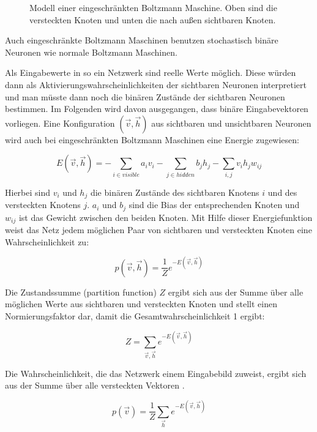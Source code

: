 \documentclass[12pt]{article}
\begin{document}
\begin{figure}[H]
	\center
	
	\caption{Modell einer eingeschränkten Boltzmann Maschine. Oben sind die versteckten Knoten und unten die nach außen sichtbaren Knoten.}
	\label{RBM}
	\end{figure}
\newpage	
Auch eingeschränkte Boltzmann Maschinen benutzen stochastisch binäre Neuronen wie normale Boltzmann Maschinen.


Als Eingabewerte in so ein Netzwerk sind reelle Werte möglich. Diese würden dann als Aktivierungswahrscheinlichkeiten der sichtbaren Neuronen interpretiert und man müsste dann noch die binären Zustände der sichtbaren Neuronen bestimmen. Im Folgenden wird davon ausgegangen, dass binäre Eingabevektoren vorliegen. 
Eine Konfiguration $(\vec{v},\vec{h})$ aus sichtbaren und unsichtbaren Neuronen wird auch bei eingeschränkten Boltzmann Maschinen eine Energie zugewiesen:

\begin{equation}
E(\vec{v},\vec{h})= - \sum_{i \in visible} a_iv_i- \sum_{j \in hidden} b_j h_j - \sum_{i,j} v_i h_j w_{ij}
\end{equation}

Hierbei sind $v_i$ und $h_j$ die binären Zustände des sichtbaren Knotens $i$ und des versteckten Knotens $j$. $a_i$ und $b_j$ sind die Bias der entsprechenden Knoten und $w_{ij}$ ist das Gewicht zwischen den beiden Knoten. Mit Hilfe dieser Energiefunktion weist das Netz jedem möglichen Paar von sichtbaren und versteckten Knoten eine Wahrscheinlichkeit zu:

\begin{equation}
p(\vec{v},\vec{h})= \frac{1}{Z} e^{-E(\vec{v},\vec{h})}
\end{equation}

Die Zustandssumme (partition function) $Z$ ergibt sich aus der Summe über alle möglichen Werte aus sichtbaren und versteckten Knoten und stellt einen Normierungsfaktor dar, damit die Gesamtwahrscheinlichkeit 1 ergibt:

\begin{equation}
Z=\sum_{\vec{v},\vec{h}} e^{-E(\vec{v},\vec{h})}
\end{equation}

Die Wahrscheinlichkeit, die das Netzwerk einem Eingabebild zuweist, ergibt sich aus der Summe über alle versteckten Vektoren \cite{guide}.

\begin{equation}
p(\vec{v})= \frac{1}{Z} \sum_{\vec{h}} e^{-E(\vec{v},\vec{h})}
\end{equation}
\end{document}
